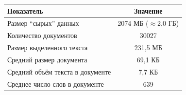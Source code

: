 \begin{tabular}{|l|c|}
\hline
Показатель & Значение \\ \hline
Размер \enquote{сырых} данных & 2074 МБ ($\approx$2{,}0 ГБ) \\ \hline
Количество документов & 30027 \\ \hline
Размер выделенного текста & 231{,}5 МБ \\ \hline
Средний размер документа & 69{,}1 КБ \\ \hline
Средний объём текста в документе & 7{,}7 КБ \\ \hline
Среднее число слов в документе & 639 \\ \hline
\end{tabular}

\pagebreak
